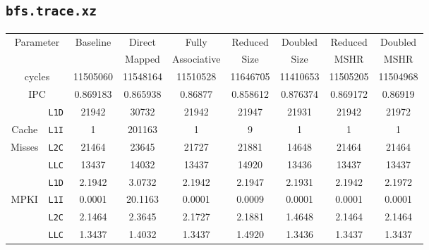 \documentclass[11pt, swedish, openany]{book}
\begin{document}
\subsection{\texttt{bfs.trace.xz}}
\begin{table}[H]
    \begin{tabular}{||c|c||c||c|c||c|c||c|c||}
        \hline
        \multicolumn{2}{||c||}{\multirow{2}{*}{Parameter}} & \multirow{2}{*}{Baseline} & Direct   & Fully       & Reduced  & Doubled  & Reduced  & Doubled  \\
        \multicolumn{2}{||c||}{}                           &                           & Mapped   & Associative & Size     & Size     & MSHR     & MSHR     \\
        \hline
        \multicolumn{2}{||c||}{cycles}                     & 11505060                  & 11548164 & 11510528    & 11646705 & 11410653 & 11505205 & 11504968 \\
        \multicolumn{2}{||c||}{IPC}                        & 0.869183                  & 0.865938 & 0.86877     & 0.858612 & 0.876374 & 0.869172 & 0.86919  \\
        \hline
                                            & \texttt{L1D} & 21942                     & 30732    & 21942       & 21947    & 21931    & 21942    & 21972    \\
        Cache                               & \texttt{L1I} & 1                         & 201163   & 1           & 9        & 1        & 1        & 1        \\
        Misses                              & \texttt{L2C} & 21464                     & 23645    & 21727       & 21881    & 14648    & 21464    & 21464    \\
                                            & \texttt{LLC} & 13437                     & 14032    & 13437       & 14920    & 13436    & 13437    & 13437    \\
        \hline
                                            & \texttt{L1D} & 2.1942                    & 3.0732   & 2.1942      & 2.1947   & 2.1931   & 2.1942   & 2.1972   \\
        \multirow{2}{*}{MPKI}               & \texttt{L1I} & 0.0001                    & 20.1163  & 0.0001      & 0.0009   & 0.0001   & 0.0001   & 0.0001   \\
                                            & \texttt{L2C} & 2.1464                    & 2.3645   & 2.1727      & 2.1881   & 1.4648   & 2.1464   & 2.1464   \\
                                            & \texttt{LLC} & 1.3437                    & 1.4032   & 1.3437      & 1.4920   & 1.3436   & 1.3437   & 1.3437   \\

\end{tabular}
\end{table}
\end{document}
